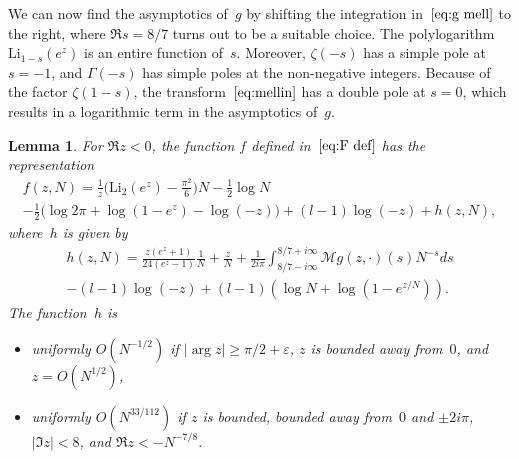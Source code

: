 \documentclass[a4paper]{amsart}
\newtheorem{lemma}[theorem]{Lemma}
\begin{document}
%
We can now find the asymptotics of~$g$ by shifting the integration
in~$\eqref{eq:g mell}$ to the right, where $\Re s =8/7$ turns out to
be a suitable choice.
The polylogarithm $\mathrm{Li}_{1-s}(e^z)$ is an entire function of~$s$.
Moreover, $\zeta(-s)$ has a simple pole at $s=-1$, and $\Gamma(-s)$ has simple
poles at the non-negative integers. Because of the factor $\zeta(1-s)$, the
transform~$\eqref{eq:mellin}$ has a double pole at  $s=0$, which results in
a logarithmic term in the asymptotics of~$g$.
%
\begin{lemma}\label{le:mellin}
  For $\Re z<0$, the function $f$ defined in~$\eqref{eq:F def}$ has the representation
  \begin{multline}\label{eq:f asympt}
     f(z,N) = \frac{1}{z}\Big( \mathrm{Li}_2(e^z) - \frac{\pi^2}{6}\Big)N
   - \frac12 \log N  \\
    - \frac12 \Big(\log 2\pi    +\log(1-e^{z})
 - \log(-z)\Big) +(l-1)\log(-z)+ h(z,N),
 \end{multline}
  where~$h$ is given by
  \begin{multline}\label{eq:h}
    h(z,N) =  \frac{z(e^z+1)}{24(e^z-1)} \frac1N +\frac{z}{N}
      + \frac{1}{2i\pi}\int_{8/7-i\infty}^{8/7+i\infty}  \mathcal{M}g(z,\cdot)(s) N^{-s} ds \\
                -(l-1) \log(-z) + (l-1) (\log N + \log (1-e^{z/N})). 
  \end{multline}
  The function~$h$ is
  \begin{itemize}
    \item[(i)] uniformly $O(N^{-1/2})$ if $|\arg z|\geq \pi/2+\varepsilon$, $z$ is  bounded away
      from~$0$, and $z=O(N^{1/2})$,
    \item[(ii)] uniformly $O(N^{33/112})$ if $z$ is bounded, bounded away from~$0$ and $\pm 2i\pi$,
      $|\Im z|<8$, and $\Re z < -N^{-7/8}$.
  \end{itemize}
\end{lemma}
\end{document}
